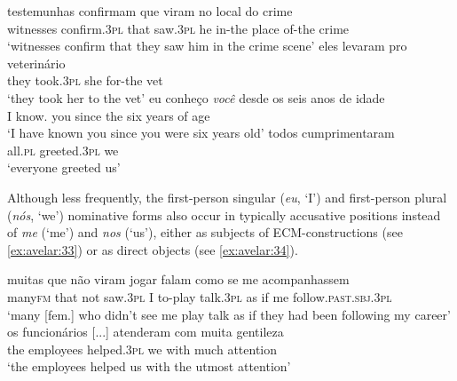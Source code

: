 \documentclass[output=paper]{langscibook}
\begin{document}
\ea\label{ex:avelar:29}
 \gll testemunhas   confirmam   que  viram  no local   do crime \\ %
         witnesses     confirm.\textsc{3pl} that   saw.\textsc{3pl} he   in-the   place   of-the crime\\
 \glt ‘witnesses confirm that they saw him in the crime scene’  
\ex\label{ex:avelar:30}
 \gll eles  levaram  pro   veterinário\\ %
         they   took.\textsc{3pl} she   for-the  vet\\
 \glt ‘they took her to the vet’ 
\ex\label{ex:avelar:31} 
 \gll eu   conheço     \textit{você}   desde   os   seis   anos   de idade \\ %
         I   know.   you   since   the  six     years   of age\\
 \glt ‘I have known you since you were six years old’
\ex\label{ex:avelar:32}
 \gll todos   cumprimentaram { } \\ %
         all.\textsc{pl} greeted.\textsc{3pl} we\\
 \glt ‘everyone greeted us’
\z 

{Although less frequently, the first-person singular (}{\textit{eu}}{, ‘I’) and first-person plural (}{\textit{nós}}{, ‘we’) nominative forms also occur in typically accusative positions instead of} {\textit{me} }{(‘me’) and} {\textit{nos} }{(‘us’), either as subjects of ECM-constructions (see \ref{ex:avelar:33}) or as direct objects (see \ref{ex:avelar:34}).}

\ea\label{ex:avelar:33} 
 \gll muitas que  não   viram  jogar falam     como   se   me     acompanhassem\\  %
         many\textsc{fm}  that   not   saw.\textsc{3pl} I   to-play talk.\textsc{3pl} as     if   me   follow.\textsc{past.sbj.3pl}\\
 \glt ‘many [fem.] who didn’t see me play talk as if they had been following my career’
\z 
\ea\label{ex:avelar:34} 
 \gll os  {funcionários [...]} atenderam  com   muita gentileza \\ %
         the  employees     helped.\textsc{3pl}   we     with   much attention\\
 \glt ‘the employees helped us with the utmost attention’
\z 
\end{document}
